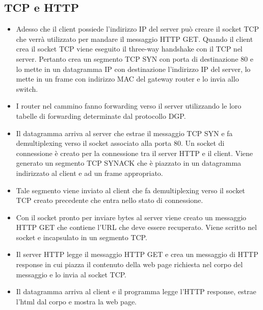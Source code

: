 \subsection{TCP e HTTP}
\begin{itemize}
\item Adesso che il client possiede l'indirizzo IP del server pu\`o creare il socket TCP che verr\`a utilizzato per mandare il messaggio HTTP GET. Quando il client crea il socket TCP viene eseguito il three-way
handshake con il TCP nel server. Pertanto crea un segmento TCP SYN con porta di destinazione 80 e lo mette in un datagramma IP con destinazione l'indirizzo IP del server, lo mette in un frame con indirizzo 
MAC del gateway router e lo invia allo switch.
\item I router nel cammino fanno forwarding verso il server utilizzando le loro tabelle di forwarding determinate dal protocollo DGP.
\item Il datagramma arriva al server che estrae il messaggio TCP SYN e fa demultiplexing verso il socket associato alla porta 80. Un socket di connessione \`e creato per la connessione tra il server HTTP e il 
client. Viene generato un segmento TCP SYNACK che \`e piazzato in un datagramma indirizzato al client e ad un frame appropriato.
\item Tale segmento viene inviato al client che fa demultiplexing verso il socket TCP creato precedente che entra nello stato di connessione.
\item Con il socket pronto per inviare bytes al server viene creato un messaggio HTTP GET che contiene l'URL che deve essere recuperato. Viene scritto nel socket e incapsulato in un segmento TCP.
\item Il server HTTP legge il messaggio HTTP GET e crea un messaggio di HTTP response in cui piazza il contenuto della web page richiesta nel corpo del messaggio e lo invia al socket TCP.
\item Il datagramma arriva al client e il programma legge l'HTTP response, estrae l'html dal corpo e mostra la web page. 
\end{itemize}
